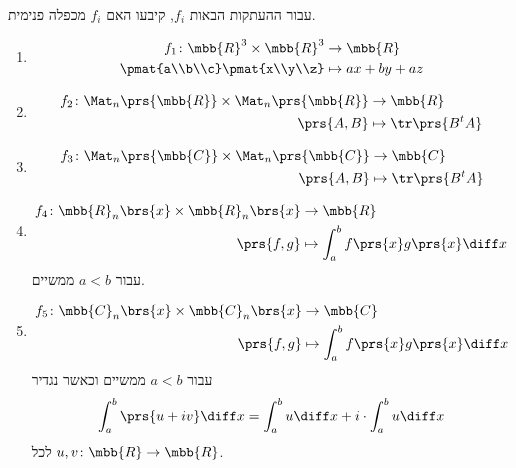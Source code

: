 \documentclass[a4paper,10pt,twoside,openany]{article}
\begin{document}
\begin{exercise}
עבור ההעתקות הבאות $f_i$, קיבעו האם $f_i$ מכפלה פנימית.

\begin{enumerate}
\item
\begin{align*}
f_1 \colon \mbb{R}^3 \times \mbb{R}^3 &\to \mbb{R} \\
\pmat{a\\b\\c}\pmat{x\\y\\z} &\mapsto ax + by + az
\end{align*}

\item
\begin{align*}
f_2 \colon \Mat_n\prs{\mbb{R}} \times \Mat_n\prs{\mbb{R}} &\to \mbb{R} \\
\prs{A,B} &\mapsto \tr\prs{B^t A}
\end{align*}

\item
\begin{align*}
f_3 \colon \Mat_n\prs{\mbb{C}} \times \Mat_n\prs{\mbb{C}} &\to \mbb{C} \\
\prs{A,B} &\mapsto \tr\prs{B^t A}
\end{align*}

\item
\begin{align*}
f_4 \colon \mbb{R}_n\brs{x} \times \mbb{R}_n\brs{x} &\to \mbb{R} \\
\prs{f,g} &\mapsto \int_a^b f\prs{x} g\prs{x} \diff x
\end{align*}
עבור
$a < b$
ממשיים.

\item
\begin{align*}
f_5 \colon \mbb{C}_n\brs{x} \times \mbb{C}_n\brs{x} &\to \mbb{C} \\
\prs{f,g} &\mapsto \int_a^b f\prs{x} g\prs{x} \diff x
\end{align*}
עבור
$a < b$
ממשיים וכאשר נגדיר
\[\int_a^b \prs{u + iv} \diff x = \int_a^b u \diff x + i \cdot \int_a^b u \diff x\]
לכל
$u,v \colon \mbb{R} \to \mbb{R}$.
\end{enumerate}
\end{exercise}
\end{document}
